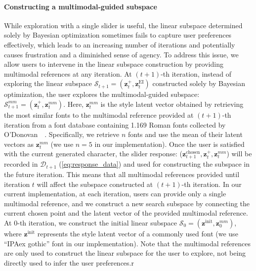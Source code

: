 \paragraph{Constructing a multimodal-guided subspace}
While exploration with a single slider is useful, the linear subspace determined solely by Bayesian optimization sometimes fails to capture user preferences effectively, which leads to an increasing number of iterations and potentially causes frustration and a diminished sense of agency.
To address this issue, we allow users to intervene in the linear subspace construction by providing multimodal references at any iteration.
At $(t+1)$-th iteration, instead of exploring the linear subspace $\mathcal{S}_{t+1}=(\bm{z}^+_t, \bm{z}^\text{EI}_t)$ constructed solely by Bayesian optimization, the user explores the multimodal-guided subspace: $\mathcal{S}^{mm}_{t+1} = (\bm{z}^+_t, \bm{z}^{mm}_t)$.
Here, $\bm{z}^{mm}_t$ is the style latent vector obtained by retrieving the most similar fonts to the multimodal reference provided at $(t+1)$-th iteration from a font database containing \num{1,169} Roman fonts collected by O'Donovan~\etal~\cite{o2014exploratory}.
Specifically, we retrieve $n$ fonts and use the mean of their latent vectors as $\bm{z}^{mm}_t$ (we use $n = 5$ in our implementation).
Once the user is satisfied with the current generated character, the slider response: ($\bm{z}_{t+1}^\text{chosen},\bm{z}_{t}^{+}, \bm{z}_{t}^{mm}$) will be recorded in $\mathcal{D}_{t+1}$ (\autoref{eq:response_data}) and used for constructing the subspace in the future iteration.
This means that all multimodal references provided until iteration $t$ will affect the subspace constructed at $(t+1)$-th iteration.
In our current implementation, at each iteration, users can provide only a single multimodal reference, and we construct a new search subspace by connecting the current chosen point and the latent vector of the provided multimodal reference.
At $0$-th iteration, we construct the initial linear subspace $\mathcal{S}_{0}=(\bm{z}^{\text{init}}, \bm{z}^{mm}_{0})$, where $\bm{z}^{\text{init}}$ represents the style latent vector of a commonly used font (we use ``IPAex gothic'' font in our implementation).
Note that the multimodal references are only used to construct the linear subspace for the user to explore, not being directly used to infer the user preferences.r

